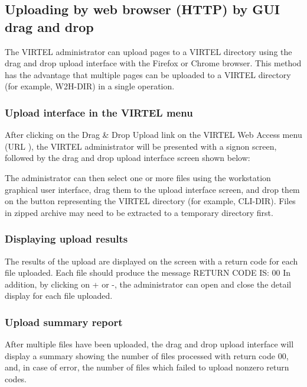 \documentclass[letterpaper,10pt,english]{sphinxmanual}
\begin{document}
\subsection{Uploading by web browser (HTTP) by GUI drag and drop}
\label{\detokenize{audit_operations_ and_performance:uploading-by-web-browser-http-by-gui-drag-and-drop}}\label{\detokenize{audit_operations_ and_performance:index-59}}
The VIRTEL administrator can upload pages to a VIRTEL directory using the drag and drop upload interface with the Firefox or Chrome browser. This method has the advantage that multiple pages can be uploaded to a VIRTEL directory (for example, W2H-DIR) in a single operation.


\subsubsection{Upload interface in the VIRTEL menu}
\label{\detokenize{audit_operations_ and_performance:upload-interface-in-the-virtel-menu}}
After clicking on the Drag \& Drop Upload link on the VIRTEL Web Access menu (URL ), the VIRTEL administrator will be presented with a signon screen, followed by the drag and drop upload interface screen shown below:



The administrator can then select one or more files using the workstation graphical user interface, drag them to the upload interface screen, and drop them on the button representing the VIRTEL directory (for example, CLI-DIR). Files in zipped archive may need to be extracted to a temporary directory first.


\subsubsection{Displaying upload results}
\label{\detokenize{audit_operations_ and_performance:displaying-upload-results}}


The results of the upload are displayed on the screen with a return code for each file uploaded. Each file should produce the message RETURN CODE IS: 00 In addition, by clicking on + or -, the administrator can open and close the detail display for each file uploaded.


\subsubsection{Upload summary report}
\label{\detokenize{audit_operations_ and_performance:upload-summary-report}}
After multiple files have been uploaded, the drag and drop upload interface will display a summary showing the number of files processed with return code 00, and, in case of error, the number of files which failed to upload nonzero return codes.
\end{document}
